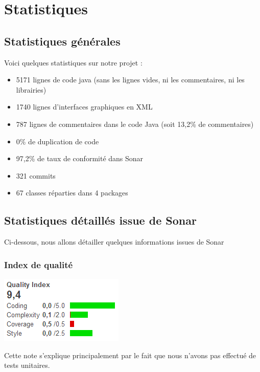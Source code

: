 \documentclass{report}
\begin{document}
\newpage

\section{Statistiques}
\bigskip


\subsection{Statistiques générales}
\bigskip


Voici quelques statistiques sur notre projet :
\begin{itemize}
\item 5171 lignes de code java (sans les lignes vides, ni les
commentaires, ni les librairies)
\item 1740 lignes d’interfaces graphiques en XML
\item 787 lignes de commentaires dans le code Java (soit 13,2\% de
commentaires)
\item 0\% de duplication de code
\item 97,2\% de taux de conformité dans Sonar
\item 321 commits
\item 67 classes réparties dans 4 packages
\end{itemize}

\subsection{Statistiques détaillés issue de Sonar}
\bigskip


Ci-dessous, nous allons détailler quelques informations issues de Sonar

\subsubsection{Index de qualité}


\begin{center}
\includegraphics{images/quality_index}
\end{center}

Cette note s’explique principalement par le fait que nous n’avons pas
effectué de tests unitaires.
\end{document}
